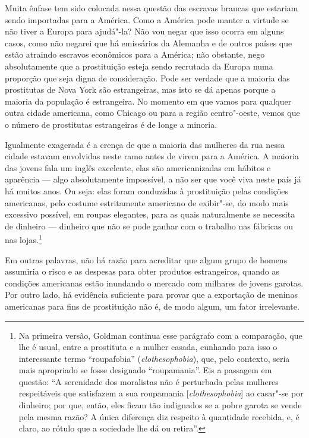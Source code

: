 Muita ênfase tem sido colocada nessa questão das escravas brancas que
estariam sendo importadas para a América. Como a América pode manter a
virtude se não tiver a Europa para ajudá"-la? Não vou negar que isso
ocorra em alguns casos, como não negarei que há emissários da Alemanha e
de outros países que estão atraindo escravos econômicos para a América;
não obstante, nego absolutamente que a prostituição esteja sendo
recrutada da Europa numa proporção que seja digna de consideração. Pode
ser verdade que a maioria das prostitutas de Nova York são estrangeiras,
mas isto se dá apenas porque a maioria da população é estrangeira. No
momento em que vamos para qualquer outra cidade americana, como Chicago
ou para a região centro"-oeste, vemos que o número de prostitutas
estrangeiras é de longe a minoria.

Igualmente exagerada é a crença de que a maioria das mulheres da rua
nessa cidade estavam envolvidas neste ramo antes de virem para a
América. A maioria das jovens fala um inglês excelente, elas são
americanizadas em hábitos e aparência --- algo absolutamente impossível,
a não ser que você viva neste país já há muitos anos. Ou seja: elas
foram conduzidas à prostituição pelas condições americanas, pelo
costume estritamente americano de exibir"-se, do modo mais excessivo
possível, em roupas elegantes, para as quais naturalmente se necessita
de dinheiro --- dinheiro que não se pode ganhar com o trabalho nas
fábricas ou nas lojas.\footnote{Na primeira versão, Goldman continua
  esse parágrafo com a comparação, que lhe é usual, entre a prostituta e
  a mulher casada, cunhando para isso o interessante termo 
  ``roupafobia'' (\emph{clothesophobia}), que, pelo contexto, seria mais
  apropriado se fosse designado ``roupamania''. Eis a
  passagem em questão: ``A serenidade dos moralistas não é perturbada
  pelas mulheres respeitáveis que satisfazem a sua roupamania
  {[}\emph{clothesophobia}{]} ao casar"-se por dinheiro; por que, então, eles
  ficam tão indignados se a pobre garota se vende pela mesma razão? A
  única diferença diz respeito à quantidade recebida, e, é claro, ao
  rótulo que a sociedade lhe dá ou retira''.}

Em outras palavras, não há razão para acreditar que algum grupo de
homens assumiria o risco e as despesas para obter produtos estrangeiros,
quando as condições americanas estão inundando o mercado com milhares de
jovens garotas. Por outro lado, há evidência suficiente para provar
que a exportação de meninas americanas para fins de prostituição não é,
de modo algum, um fator irrelevante.

